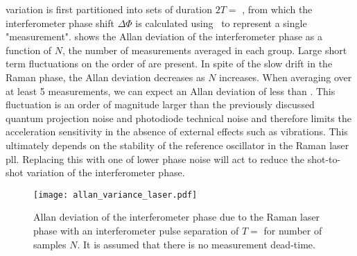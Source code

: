 variation is first partitioned into sets of duration
$2T = $ , from which the interferometer phase shift $\Delta
\Phi$ is calculated using~ to represent
a single "measurement".
 shows the Allan deviation of the 
interferometer phase as a function of $N$, the number of measurements
averaged in each group. Large short term fluctuations on the order of
 are present. In spite of the slow drift in the Raman
phase, the Allan deviation decreases as
$N$ increases. When averaging over at least 5 measurements, we can expect an Allan
deviation of less than
. This fluctuation is an order of magnitude
larger than the previously discussed quantum projection noise and photodiode technical
noise and therefore limits the acceleration sensitivity in the absence
of external effects such as vibrations. This ultimately depends on the
stability of the reference oscillator in the Raman laser \ac{pll}.
Replacing this with one of lower phase noise will act to reduce the
shot-to-shot variation of the interferometer phase. 
\begin{figure}[htpb!]
  \centering
  \texttt{[image: allan\_variance\_laser.pdf]}
  \caption[Allan deviation of the interferometer phase due to the
  Raman laser phase.]{Allan
    deviation of the interferometer phase due to the Raman laser phase
    with an
    interferometer pulse separation of $T = $  for
  number of samples $N$. It is assumed that there is no measurement
dead-time.}
  \label{fig:allan_dev_m2}
\end{figure}

